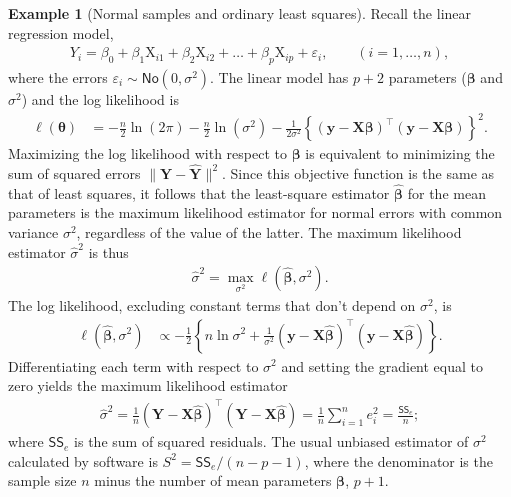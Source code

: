 \documentclass[
  11pt,
  letterpaper,
]{book}
\theoremstyle{definition}
\theoremstyle{definition}
\newtheorem{example}{Example}[chapter]
\theoremstyle{definition}
\theoremstyle{definition}
\theoremstyle{remark}
\begin{document}
\begin{example}[Normal samples and ordinary least squares]
Recall the linear regression model,
\begin{align*}
Y_i=\beta_0+\beta_1 \mathrm{X}_{i1}+\beta_2 \mathrm{X}_{i2}+\ldots +\beta_p \mathrm{X}_{ip} + \varepsilon_i, \qquad  (i=1, \ldots, n),
\end{align*}
where the errors \(\varepsilon_i \sim \mathsf{No}(0, \sigma^2)\).
The linear model has \(p+2\) parameters (\(\boldsymbol{\beta}\) and \(\sigma^2\)) and the log likelihood is
\begin{align*}
\ell(\boldsymbol{\theta})&=-\frac{n}{2} \ln(2\pi)-\frac{n}{2} \ln (\sigma^2) -\frac{1}{2\sigma^2}\left\{(\boldsymbol{y}-\mathbf{X}\boldsymbol{\beta})^\top(\boldsymbol{y}-\mathbf{X}\boldsymbol{\beta})\right\}^2.
\end{align*}
Maximizing the log likelihood with respect to \(\boldsymbol{\beta}\) is equivalent to
minimizing the sum of squared errors \(\|\boldsymbol{Y} - \widehat{\boldsymbol{Y}}\|^2\). Since this objective function is the same as that of least squares, it follows that the least-square estimator \(\widehat{\boldsymbol{\beta}}\) for the mean parameters is the maximum likelihood estimator for normal errors with common variance \(\sigma^2\), regardless of the value of the latter. The maximum likelihood estimator \(\widehat{\sigma}^2\) is thus
\begin{align*}
\hat{\sigma}^2=\max_{\sigma^2} \ell(\widehat{\boldsymbol{\beta}}, \sigma^2).
\end{align*}
The log likelihood, excluding constant terms that don't depend on \(\sigma^2\), is
\begin{align*}
\ell(\widehat{\boldsymbol{\beta}}, \sigma^2)
&\propto-\frac{1}{2}\left\{n\ln\sigma^2+\frac{1}{\sigma^2}(\boldsymbol{y}-\mathbf{X}\hat{\boldsymbol{\beta}})^\top(\boldsymbol{y}-\mathbf{X}\hat{\boldsymbol{\beta}})\right\}.
\end{align*}
Differentiating each term with respect to \(\sigma^2\) and setting the gradient equal to zero yields the maximum likelihood estimator
\begin{align*}
\hat{\sigma}^2=\frac{1}{n}(\boldsymbol{Y}-\mathbf{X}\hat{\boldsymbol{\beta}})^\top(\boldsymbol{Y}-\mathbf{X}\hat{\boldsymbol{\beta}})= \frac{1}{n} \sum_{i=1}^n e_i^2= \frac{\mathsf{SS}_e}{n};
\end{align*}
where \(\mathsf{SS}_e\) is the sum of squared residuals. The usual unbiased estimator of \(\sigma^2\) calculated by software is \(S^2=\mathsf{SS}_e/(n-p-1)\), where the denominator is the sample size \(n\) minus the number of mean parameters \(\boldsymbol{\beta}\), \(p+1\).
\end{example}
\end{document}
